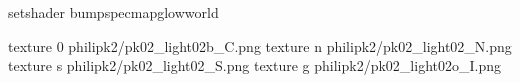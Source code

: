 setshader bumpspecmapglowworld


texture 0 philipk2/pk02_light02b_C.png
texture n philipk2/pk02_light02_N.png
texture s philipk2/pk02_light02_S.png
texture g philipk2/pk02_light02o_I.png
